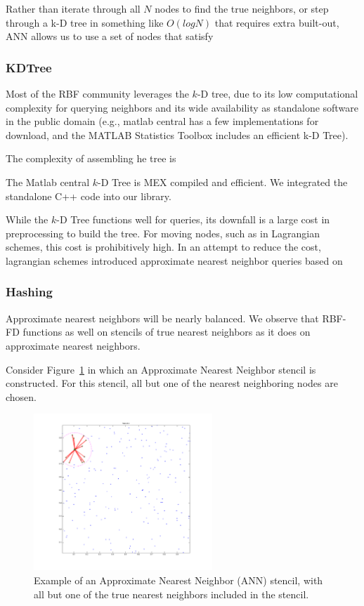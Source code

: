 \documentclass[11pt]{report}
\begin{document}
{Rather than iterate through all $N$ nodes to find the true neighbors, or step through a k-D tree in something like $O(log N)$ that requires extra built-out, ANN allows us to use a set of nodes that satisfy


\subsubsection{KDTree}
Most of the RBF community leverages the $k$-D tree, due to its low computational complexity for querying neighbors and its wide availability as standalone software in the public domain (e.g., matlab central has a few implementations for download, and the MATLAB Statistics Toolbox includes an efficient k-D Tree). 

The complexity of assembling he tree is

The Matlab central $k$-D Tree is MEX compiled and efficient. We integrated the standalone C++ code into our library.  

While the $k$-D Tree functions well for queries, its downfall is a large cost in preprocessing to build the tree. For moving nodes, such as in Lagrangian schemes, this cost is prohibitively high. In an attempt to reduce the cost, lagrangian schemes introduced approximate nearest neighbor queries based on 


\subsubsection{Hashing}

Approximate nearest neighbors will be nearly balanced. 
We observe that RBF-FD functions as well on stencils of true nearest neighbors as it does on approximate nearest neighbors.

Consider Figure~\ref{fig:ann_stencil} in which an Approximate Nearest Neighbor stencil is constructed. For this stencil, all but one of the nearest neighboring nodes are chosen. 

\begin{figure}
\centering
\includegraphics[width=0.6\textwidth]{rbffd_methods_content/neighbors/neighbor_incorrect.png}
\caption{Example of an Approximate Nearest Neighbor (ANN) stencil, with all but one of the true nearest neighbors included in the stencil. }
\label{fig:ann_stencil}
\end{figure}



}
\end{document}
